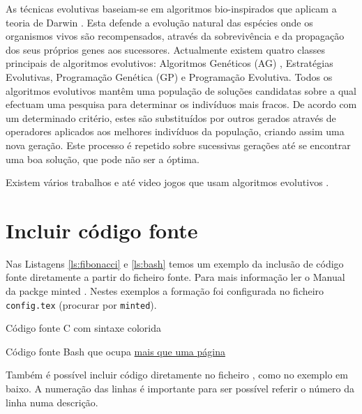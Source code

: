 As técnicas evolutivas baseiam-se em algoritmos bio-inspirados que aplicam a teoria de Darwin \parencite{Darwin1859}. Esta defende a evolução natural das espécies onde os organismos vivos são recompensados, através da sobrevivência e da propagação dos seus próprios genes aos sucessores. Actualmente existem quatro classes principais de algoritmos evolutivos: Algoritmos Genéticos (AG) \parencite{Holland1975}, Estratégias Evolutivas, Programação Genética (GP) \parencite{Koza1992} e Programação Evolutiva. Todos os algoritmos evolutivos mantêm uma população de soluções candidatas sobre a qual efectuam uma pesquisa para determinar os indivíduos mais fracos. De acordo com um determinado critério, estes são substituídos por outros gerados através de operadores aplicados aos melhores indivíduos da população, criando assim uma nova geração. Este processo é repetido sobre sucessivas gerações até se encontrar uma boa solução, que pode não ser a óptima.

Existem vários trabalhos e até video jogos que usam algoritmos evolutivos \parencite{Sims1992,url_Spore}.

\section{Incluir código fonte}
Nas Listagens \ref{ls:fibonacci} e \ref{ls:bash} temos um exemplo da inclusão de código fonte diretamente a partir do ficheiro fonte. Para mais informação ler o Manual da packge minted \parencite{Rudolph2016}. Nestes exemplos a formação foi configurada no ficheiro \texttt{config.tex} (procurar por \texttt{minted}). 


\begin{listing}[H] %
    \caption{Código fonte C com sintaxe colorida}
    \label{ls:fibonacci}
\end{listing}


\begin{longlisting} %
    \caption{Código fonte Bash que ocupa \underline{mais que uma página}}
    \label{ls:bash}
\end{longlisting}



Também é possível incluir código diretamente no ficheiro \LaTeXe, como no exemplo em baixo. A numeração das linhas é importante para ser possível referir o número da linha numa descrição.



